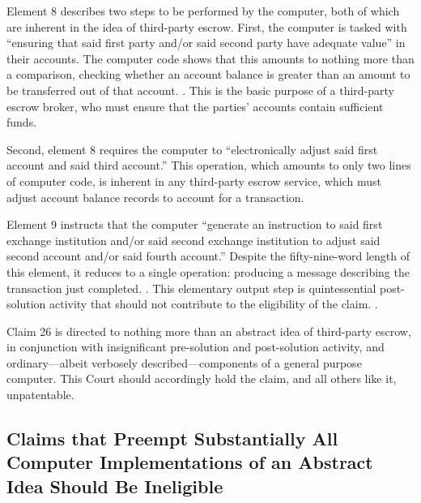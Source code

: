 \documentclass{scotus}
\begin{document}
Element 8 describes two steps to be performed by the computer, both of which are
inherent in the idea of third-party escrow. First, the computer is tasked with
``ensuring that said first party and/or said second party have adequate value''
in their accounts. The computer code shows that this amounts to nothing more
than a comparison, checking whether an account balance is greater than an amount
to be transferred out of that account. . This is the basic purpose of a third-party escrow broker, who
must ensure that the parties' accounts contain sufficient funds.

Second, element 8 requires the computer to ``electronically adjust said first
account and said third account.'' This operation, which amounts to only two
lines of computer code,
is inherent in any third-party escrow service, which must adjust account balance
records to account for a transaction.

Element 9 instructs that the computer ``generate an instruction to said first
exchange institution and/or said second exchange institution to adjust said
second account and/or said fourth account.'' Despite the fifty-nine-word length
of this element, it reduces to a single operation: producing a
message describing the transaction just completed. . This elementary output step is quintessential
post-solution activity
that should not contribute to the eligibility of the claim. .

Claim 26 is directed to nothing more than an abstract idea of
third-party escrow, in conjunction with insignificant pre-solution and
post-solution activity, and ordinary---albeit verbosely described---components
of
a general purpose computer.
This Court should accordingly hold the claim, and all others like it,
unpatentable.



%
%
\subsection{Claims that Preempt Substantially All Computer Implementations of an
Abstract Idea Should Be Ineligible}

\iffalse
A patent claim with the ``practical effect'' of removing an abstract idea from
the public domain is ineligible under \inline{101}. \sentence{see benson at
71-72}.
Claim 26 of the '375 patent would have the practical effect of removing all uses
of an abstract idea \emph{implemented on a general-purpose computer} from the
public domain.
\fi
\end{document}
